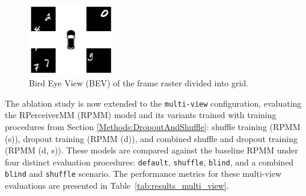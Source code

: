 \begin{figure}
    \centering
    \includegraphics[width=0.33\textwidth]{figures/figure_methods_dataset_image_view_bev.png}
    \caption{Bird Eye View (BEV) of the frame raster divided into grid.}
    \label{fig:figure_methods_dataset_image_view_bev}
\end{figure}

The ablation study is now extended to the \texttt{multi-view} configuration, evaluating the RPerceiverMM (RPMM) model and its variants trained with training procedures from Section \ref{Methods:DropoutAndShuffle}: shuffle training (RPMM (s)), dropout training (RPMM (d)), and combined shuffle and dropout training (RPMM (d, s)). These models are compared against the baseline RPMM under four distinct evaluation procedures: \texttt{default}, \texttt{shuffle}, \texttt{blind}, and a combined \texttt{blind} and \texttt{shuffle} scenario. The performance metrics for these multi-view evaluations are presented in Table~\ref{tab:results_multi_view}.


